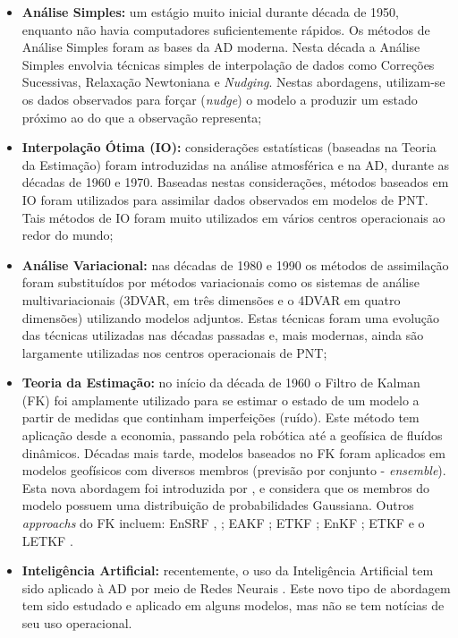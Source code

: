 \begin{itemize}
\item \textbf{Análise Simples:} um estágio muito inicial durante década de 1950, enquanto não havia computadores suficientemente rápidos. Os métodos de Análise Simples foram as bases da AD moderna. Nesta década a Análise Simples envolvia técnicas simples de interpolação de dados como Correções Sucessivas, Relaxação Newtoniana e \textit{Nudging}. Nestas abordagens, utilizam-se os dados observados para forçar (\textit{nudge}) o modelo a produzir um estado próximo ao do que a observação representa;
\item \textbf{Interpolação Ótima (IO):} considerações estatísticas (baseadas na Teoria da Estimação) foram introduzidas na análise atmosférica e na AD, durante as décadas de 1960 e 1970. Baseadas nestas considerações, métodos baseados em IO foram utilizados para assimilar dados observados em modelos de PNT. Tais métodos de IO foram muito utilizados em vários centros operacionais ao redor do mundo;
\item \textbf{Análise Variacional:} nas décadas de 1980 e 1990 os métodos de assimilação foram substituídos por métodos variacionais como os sistemas de análise multivariacionais (3DVAR, em três dimensões e o 4DVAR em quatro dimensões) utilizando modelos adjuntos. Estas técnicas foram uma evolução das técnicas utilizadas nas décadas passadas e, mais modernas, ainda são largamente utilizadas nos centros operacionais de PNT; 
\item \textbf{Teoria da Estimação:} no início da década de 1960 o Filtro de Kalman (FK) foi amplamente utilizado para se estimar o estado de um modelo a partir de medidas que continham imperfeições (ruído). Este método tem aplicação desde a economia, passando pela robótica até a geofísica de fluídos dinâmicos. Décadas mais tarde, modelos baseados no FK foram aplicados em modelos geofísicos com diversos membros (previsão por conjunto - \textit{ensemble}). Esta nova abordagem foi introduzida por ,  e considera que os membros do modelo possuem uma distribuição de probabilidades Gaussiana. Outros \textit{approachs} do FK incluem: EnSRF \cite{andres68}, \cite{withakerhamill02}; EAKF \cite{anderson01}; ETKF \cite{bishopetal01}; EnKF \cite{kalnay04}; ETKF \cite{kalnay03} e o LETKF \cite{hunt05}.
\item \textbf{Inteligência Artificial:} recentemente, o uso da Inteligência Artificial tem sido aplicado à AD por meio de Redes Neurais \cite{nowosad01}. Este novo tipo de abordagem tem sido estudado e aplicado em alguns modelos, mas não se tem notícias de seu uso operacional.
\end{itemize}

